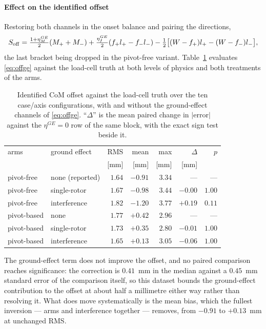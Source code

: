 \documentclass[10pt]{article}
\begin{document}
\paragraph{Effect on the identified offset}
Restoring both channels in the onset balance and pairing the
directions,
\begin{equation}
S_{\rm off} = \tfrac{1+\eta_M^{GE}}{2}(M_+ + M_-)
+ \tfrac{\eta_f^{GE}}{2}(f_+ l_+ - f_- l_-)
- \tfrac12\big[(W - f_+)l_+ - (W - f_-)l_-\big],
\label{eq:offge}
\end{equation}
the last bracket being dropped in the pivot-free variant.
Table~\ref{tab:offge} evaluates \eqref{eq:offge} against the load-cell
truth at both levels of physics and both treatments of the arms.

\begin{table}[t]
\centering
\caption{Identified CoM offset against the load-cell truth over the
ten case/axis configurations, with and without the ground-effect
channels of \eqref{eq:offge}. ``$\Delta$'' is the mean paired change
in $|$error$|$ against the $\eta^{GE} = 0$ row of the same block, with
the exact sign test beside it.}
\label{tab:offge}
\small
\setlength{\tabcolsep}{4pt}
\begin{tabular}{@{}ll rrr rr@{}}
\hline
arms & ground effect & RMS & mean & max & $\Delta$ & $p$ \\
 & & [mm] & [mm] & [mm] & [mm] & \\
\hline
pivot-free & none (reported) & $1.64$ & $-0.91$ & $3.34$ & --- & --- \\
pivot-free & single-rotor & $1.67$ & $-0.98$ & $3.44$ & $-0.00$ & $1.00$ \\
pivot-free & interference & $1.82$ & $-1.20$ & $3.77$ & $+0.19$ & $0.11$ \\
\hline
pivot-based & none & $1.77$ & $+0.42$ & $2.96$ & --- & --- \\
pivot-based & single-rotor & $1.73$ & $+0.35$ & $2.80$ & $-0.01$ & $1.00$ \\
pivot-based & interference & $1.65$ & $+0.13$ & $3.05$ & $-0.06$ & $1.00$ \\
\hline
\end{tabular}
\end{table}

The ground-effect term does not improve the offset, and no paired
comparison reaches significance: the correction is $0.41$~mm in the
median against a $0.45$~mm standard error of the comparison itself, so
this dataset bounds the ground-effect contribution to the offset at
about half a millimetre either way rather than resolving it. What does
move systematically is the mean bias, which the fullest inversion ---
arms and interference together --- removes, from $-0.91$ to
$+0.13$~mm at unchanged RMS.
\end{document}
